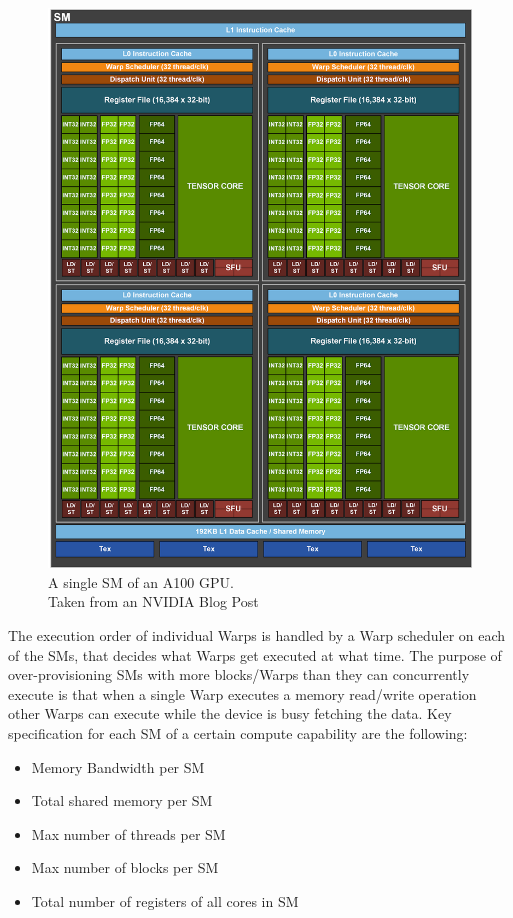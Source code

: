 \begin{figure}
    \centering
    \includegraphics[width=.7\textwidth]{img/a100.png}
    \caption[Diagram of a single A100 SM]{A single SM of an A100 GPU.\\Taken from an NVIDIA Blog Post\footnotemark}
    \label{fig:cuda-sm}
\end{figure}
The execution order of individual Warps is handled by a Warp scheduler on each of the SMs, that decides what Warps get executed at what time.
The purpose of over-provisioning SMs with more blocks/Warps than they can concurrently execute is that when a single Warp executes a memory read/write operation other Warps can execute while the device is busy fetching the data.
Key specification for each SM of a certain compute capability are the following:
\begin{itemize}
    \item Memory Bandwidth per SM
    \item Total shared memory per SM
    \item Max number of threads per SM
    \item Max number of blocks per SM
    \item Total number of registers of all cores in SM
\end{itemize}

